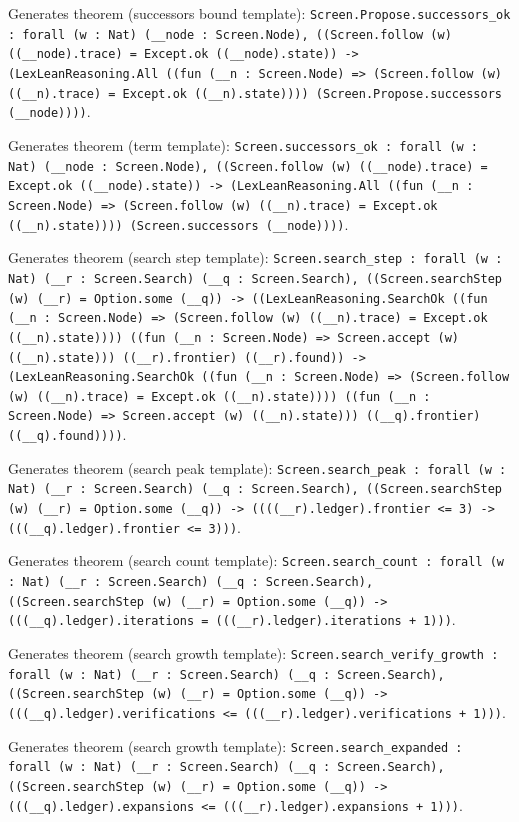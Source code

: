 \documentclass[11pt]{article}
\begin{document}
\noindent Generates theorem (successors bound template): \texttt{Screen.Propose.successors\_ok : forall (w : Nat) (\_\_node : Screen.Node), ((Screen.follow (w) ((\_\_node).trace) = Except.ok ((\_\_node).state)) -> (LexLeanReasoning.All ((fun (\_\_n : Screen.Node) => (Screen.follow (w) ((\_\_n).trace) = Except.ok ((\_\_n).state)))) (Screen.Propose.successors (\_\_node))))}.\par
\noindent Generates theorem (term template): \texttt{Screen.successors\_ok : forall (w : Nat) (\_\_node : Screen.Node), ((Screen.follow (w) ((\_\_node).trace) = Except.ok ((\_\_node).state)) -> (LexLeanReasoning.All ((fun (\_\_n : Screen.Node) => (Screen.follow (w) ((\_\_n).trace) = Except.ok ((\_\_n).state)))) (Screen.successors (\_\_node))))}.\par
\noindent Generates theorem (search step template): \texttt{Screen.search\_step : forall (w : Nat) (\_\_r : Screen.Search) (\_\_q : Screen.Search), ((Screen.searchStep (w) (\_\_r) = Option.some (\_\_q)) -> ((LexLeanReasoning.SearchOk ((fun (\_\_n : Screen.Node) => (Screen.follow (w) ((\_\_n).trace) = Except.ok ((\_\_n).state)))) ((fun (\_\_n : Screen.Node) => Screen.accept (w) ((\_\_n).state))) ((\_\_r).frontier) ((\_\_r).found)) -> (LexLeanReasoning.SearchOk ((fun (\_\_n : Screen.Node) => (Screen.follow (w) ((\_\_n).trace) = Except.ok ((\_\_n).state)))) ((fun (\_\_n : Screen.Node) => Screen.accept (w) ((\_\_n).state))) ((\_\_q).frontier) ((\_\_q).found))))}.\par
\noindent Generates theorem (search peak template): \texttt{Screen.search\_peak : forall (w : Nat) (\_\_r : Screen.Search) (\_\_q : Screen.Search), ((Screen.searchStep (w) (\_\_r) = Option.some (\_\_q)) -> ((((\_\_r).ledger).frontier <= 3) -> (((\_\_q).ledger).frontier <= 3)))}.\par
\noindent Generates theorem (search count template): \texttt{Screen.search\_count : forall (w : Nat) (\_\_r : Screen.Search) (\_\_q : Screen.Search), ((Screen.searchStep (w) (\_\_r) = Option.some (\_\_q)) -> (((\_\_q).ledger).iterations = (((\_\_r).ledger).iterations + 1)))}.\par
\noindent Generates theorem (search growth template): \texttt{Screen.search\_verify\_growth : forall (w : Nat) (\_\_r : Screen.Search) (\_\_q : Screen.Search), ((Screen.searchStep (w) (\_\_r) = Option.some (\_\_q)) -> (((\_\_q).ledger).verifications <= (((\_\_r).ledger).verifications + 1)))}.\par
\noindent Generates theorem (search growth template): \texttt{Screen.search\_expanded : forall (w : Nat) (\_\_r : Screen.Search) (\_\_q : Screen.Search), ((Screen.searchStep (w) (\_\_r) = Option.some (\_\_q)) -> (((\_\_q).ledger).expansions <= (((\_\_r).ledger).expansions + 1)))}.\par
\end{document}
